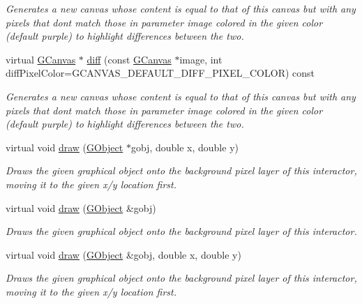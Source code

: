\begin{DoxyCompactItemize}
\begin{DoxyCompactList}\small\item\em Generates a new canvas whose content is equal to that of this canvas but with any pixels that don\textquotesingle{}t match those in parameter \textquotesingle{}image\textquotesingle{} colored in the given color (default purple) to highlight differences between the two. \end{DoxyCompactList}\item 
virtual \mbox{\hyperlink{classGCanvas}{G\+Canvas}} $\ast$ \mbox{\hyperlink{classGCanvas_a5385d5c8fda55dfe0b20851d293b338b}{diff}} (const \mbox{\hyperlink{classGCanvas}{G\+Canvas}} $\ast$image, int diff\+Pixel\+Color=G\+C\+A\+N\+V\+A\+S\+\_\+\+D\+E\+F\+A\+U\+L\+T\+\_\+\+D\+I\+F\+F\+\_\+\+P\+I\+X\+E\+L\+\_\+\+C\+O\+L\+OR) const
\begin{DoxyCompactList}\small\item\em Generates a new canvas whose content is equal to that of this canvas but with any pixels that don\textquotesingle{}t match those in parameter \textquotesingle{}image\textquotesingle{} colored in the given color (default purple) to highlight differences between the two. \end{DoxyCompactList}\item 
virtual void \mbox{\hyperlink{classGDrawingSurface_acc3825d7a24815d1e2f78e7c3ffea6cc}{draw}} (\mbox{\hyperlink{classGObject}{G\+Object}} $\ast$gobj, double x, double y)
\begin{DoxyCompactList}\small\item\em Draws the given graphical object onto the background pixel layer of this interactor, moving it to the given x/y location first. \end{DoxyCompactList}\item 
virtual void \mbox{\hyperlink{classGDrawingSurface_a022a8d51c7fabcd79a0c809233e93453}{draw}} (\mbox{\hyperlink{classGObject}{G\+Object}} \&gobj)
\begin{DoxyCompactList}\small\item\em Draws the given graphical object onto the background pixel layer of this interactor. \end{DoxyCompactList}\item 
virtual void \mbox{\hyperlink{classGDrawingSurface_a8af8762bd6720e0a1d2a84b190e3dc96}{draw}} (\mbox{\hyperlink{classGObject}{G\+Object}} \&gobj, double x, double y)
\begin{DoxyCompactList}\small\item\em Draws the given graphical object onto the background pixel layer of this interactor, moving it to the given x/y location first. \end{DoxyCompactList}\item 

\end{DoxyCompactItemize}
